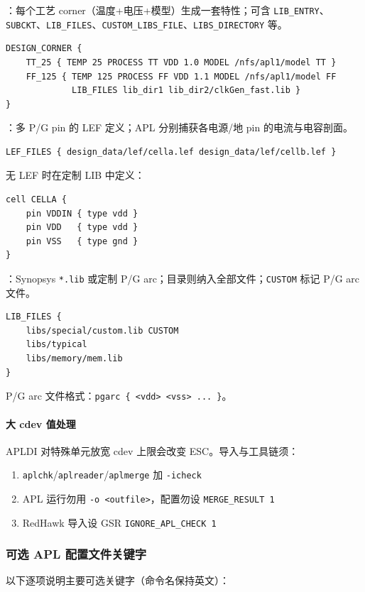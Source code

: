 ：每个工艺 corner（温度+电压+模型）生成一套特性；可含 \texttt{LIB_ENTRY}、\texttt{SUBCKT}、\texttt{LIB_FILES}、\texttt{CUSTOM_LIBS_FILE}、\texttt{LIBS_DIRECTORY} 等。
\begin{lstlisting}
DESIGN_CORNER {
    TT_25 { TEMP 25 PROCESS TT VDD 1.0 MODEL /nfs/apl1/model TT }
    FF_125 { TEMP 125 PROCESS FF VDD 1.1 MODEL /nfs/apl1/model FF
             LIB_FILES lib_dir1 lib_dir2/clkGen_fast.lib }
}
\end{lstlisting}

：多 P/G pin 的 LEF 定义；APL 分别捕获各电源/地 pin 的电流与电容剖面。
\begin{lstlisting}
LEF_FILES { design_data/lef/cella.lef design_data/lef/cellb.lef }
\end{lstlisting}
无 LEF 时在定制 LIB 中定义：
\begin{lstlisting}
cell CELLA {
    pin VDDIN { type vdd }
    pin VDD   { type vdd }
    pin VSS   { type gnd }
}
\end{lstlisting}

：Synopsys \texttt{*.lib} 或定制 P/G arc；目录则纳入全部文件；\texttt{CUSTOM} 标记 P/G arc 文件。
\begin{lstlisting}
LIB_FILES {
    libs/special/custom.lib CUSTOM
    libs/typical
    libs/memory/mem.lib
}
\end{lstlisting}
P/G arc 文件格式：\texttt{pgarc \{ <vdd> <vss> ... \}}。

\paragraph{大 cdev 值处理}
APLDI 对特殊单元放宽 cdev 上限会改变 ESC。导入与工具链须：
\begin{enumerate}
  \item \texttt{aplchk}/\texttt{aplreader}/\texttt{aplmerge} 加 \texttt{-icheck}
  \item APL 运行勿用 \texttt{-o <outfile>}，配置勿设 \texttt{MERGE_RESULT 1}
  \item RedHawk 导入设 GSR \texttt{IGNORE_APL_CHECK 1}
\end{enumerate}

\subsubsection{可选 APL 配置文件关键字}
以下逐项说明主要可选关键字（命令名保持英文）：

\subsubsection{}
